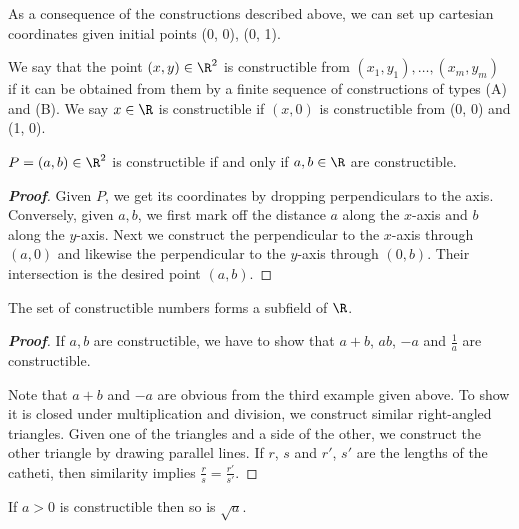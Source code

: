 As a consequence of the constructions described above, we can set up cartesian coordinates given initial points (0, 0), (0, 1).

\begin{definition}
We say that the point $(x, y) \in \R^2$ is constructible from $(x_1, y_1), \dots , (x_m, y_m)$ if it can be obtained from them by a finite sequence of constructions of types (A) and (B). We say $x \in \R$ is constructible if $(x, 0)$ is constructible from (0, 0) and (1, 0).
\end{definition}

\begin{proposition}
$P = (a, b) \in \R^2$ is constructible if and only if $a, b \in \R$ are constructible.
\end{proposition}

\begin{proof}[\bf Proof]
Given $P$, we get its coordinates by dropping perpendiculars to the axis. Conversely, given $a, b$, we first mark off the distance $a$ along the $x$-axis and $b$ along the $y$-axis. Next we construct the perpendicular to the $x$-axis through $(a, 0)$ and likewise the perpendicular to the $y$-axis through $(0, b)$. Their intersection is the desired point $(a, b)$.
\end{proof}

\begin{proposition}
The set of constructible numbers forms a subfield of $\R$.
\end{proposition}

\begin{proof}[\bf Proof]
If $a, b$ are constructible, we have to show that $a+b$, $ab$, $-a$ and $\frac 1a$ are constructible.

Note that $a + b$ and $-a$ are obvious from the third example given above. To show it is closed under multiplication and division, we construct similar right-angled triangles. Given one of the triangles and a side of the other, we construct the other triangle by drawing parallel lines. If $r$, $s$ and $r'$, $s'$ are the lengths of the catheti, then similarity implies $\frac rs = \frac{r'}{s'}$. 
\end{proof}

\begin{proposition}
If $a > 0$ is constructible then so is $\sqrt{a}$.
\end{proposition}


